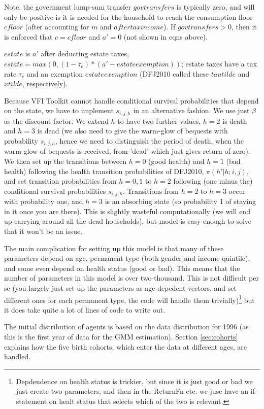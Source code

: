 \documentclass[11pt,fleqn]{article}
\begin{document}
Note, the government lump-sum transfer $govtransfers$ is typically zero, and will only be positive is it is needed for the household to reach the consumption floor $cfloor$ (after accounting for $m$ and $aftertaxincome$). If $govtransfers>0$, then it is enforced that $c=cfloor$ and $a'=0$ (not shown in eqns above).

$estate$ is $a'$ after deducting estate taxes, $estate=max(0,(1-\tau_e)*(a'-estateexemption))$; estate taxes have a tax rate $\tau_e$ and an exemption $estateexemption$ (DFJ2010 called these $tautilde$ and $xtilde$, respectively).

Because VFI Toolkit cannot handle conditional survival probabilities that depend on the state, we have to implement $s_{i,j,h}$ in an alternative fashion. We use just $\beta$ as the discount factor. We extend $h$ to have two further values, $h=2$ is death and $h=3$ is dead (we also need to give the warm-glow of bequests with probability $s_{i,j,h}$, hence we need to distinguish the period of death, when the warm-glow of bequests is received, from 'dead' which just gives return of zero). We then set up the transitions between $h=0$ (good health) and $h=1$ (bad health) following the health transition probabilities of DFJ2010, $\pi(h'|h; i,j)$, and set transition probabilities from $h=0,1$ to $h=2$ following (one minus the) conditional survival probabilities $s_{i,j,h}$. Transitions from $h=2$ to $h=3$ occur with probability one, and $h=3$ is an absorbing state (so probability 1 of staying in it once you are there). This is slightly wasteful computationally (we will end up carrying around all the dead households), but model is easy enough to solve that it won't be an issue.

The main complication for setting up this model is that many of these parameters depend on age, permanent type (both gender and income quintile), and some even depend on health status (good or bad). This means that the number of parameters in this model is over two-thousand. This is not difficult per se (you largely just set up the parameters as age-depedent vectors, and set different ones for each permanent type, the code will handle them trivially)\footnote{Depdendence on health status is trickier, but since it is just good or bad we just create two parameters, and then in the ReturnFn etc. we juse have an if-statement on healt status that selects which of the two is relevant.} but it does take quite a lot of lines of code to write out.

The initial distribution of agents is based on the data distribution for 1996 (as this is the first year of data for the GMM estimation). Section \ref{sec:cohorts} explains how the five birth cohorts, which enter the data at different ages, are handled.
\end{document}
